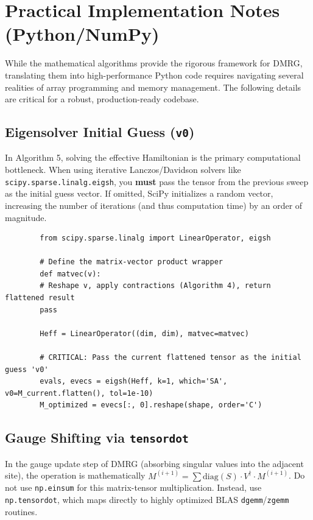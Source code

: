 \documentclass[aps,prb,onecolumn,scriptaddress]{revtex4-2}
\begin{document}
	\section{Practical Implementation Notes (Python/NumPy)}
	\label{sec:implementation_notes}
	
	While the mathematical algorithms provide the rigorous framework for DMRG, translating them into high-performance Python code requires navigating several realities of array programming and memory management. The following details are critical for a robust, production-ready codebase.
	
	\subsection{Eigensolver Initial Guess (\texttt{v0})}
	In Algorithm 5, solving the effective Hamiltonian is the primary computational bottleneck. When using iterative Lanczos/Davidson solvers like \texttt{scipy.sparse.linalg.eigsh}, you \textbf{must} pass the tensor from the previous sweep as the initial guess vector. If omitted, SciPy initializes a random vector, increasing the number of iterations (and thus computation time) by an order of magnitude.
	
	\begin{verbatim}
		from scipy.sparse.linalg import LinearOperator, eigsh
		
		# Define the matrix-vector product wrapper
		def matvec(v):
		# Reshape v, apply contractions (Algorithm 4), return flattened result
		pass
		
		Heff = LinearOperator((dim, dim), matvec=matvec)
		
		# CRITICAL: Pass the current flattened tensor as the initial guess 'v0'
		evals, evecs = eigsh(Heff, k=1, which='SA', v0=M_current.flatten(), tol=1e-10)
		M_optimized = evecs[:, 0].reshape(shape, order='C')
	\end{verbatim}
	
	\subsection{Gauge Shifting via \texttt{tensordot}}
	In the gauge update step of DMRG (absorbing singular values into the adjacent site), the operation is mathematically $M^{(i+1)} = \sum \text{diag}(S) \cdot V^\dagger \cdot M^{(i+1)}$. Do not use \texttt{np.einsum} for this matrix-tensor multiplication. Instead, use \texttt{np.tensordot}, which maps directly to highly optimized BLAS \texttt{dgemm}/\texttt{zgemm} routines.
	
\end{document}
